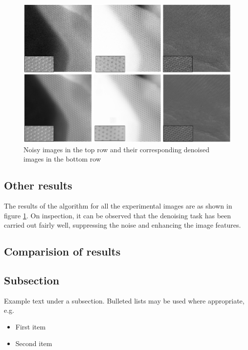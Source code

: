 \documentclass[fleqn,10pt]{wlscirep}
\begin{document}
\begin{figure}[H]
	\centering
	\includegraphics[scale=0.65]{./imgs/denoising_algo_result.png}
	\caption[Non-Local Self-Similarity based image denoising result for all experimental data]{Noisy images in the top row and their corresponding denoised images in the bottom row}
	\label{fig:denoised_result_analysis}
\end{figure}

\subsection*{Other results}

The results of the algorithm for all the experimental images are as shown in figure \ref{fig:denoised_result_analysis}. On inspection, it can be observed that the denoising task has been carried out fairly well, suppressing the noise and enhancing the image features.

\subsection*{Comparision of results}




\subsection*{Subsection}

Example text under a subsection. Bulleted lists may be used where appropriate, e.g.

\begin{itemize}
	\item First item
	\item Second item
\end{itemize}
\end{document}
